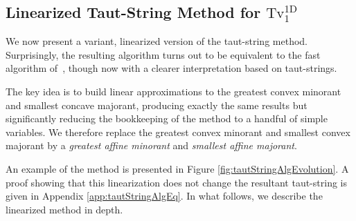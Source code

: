 \documentclass[twoside,11pt]{article}
\newcommand{\tvell}{\text{Tv}}
\newcommand{\oned}{\text{1D}}
\numberwithin{equation}{section}
\numberwithin{theorem}{section}
\begin{document}
\subsection{Linearized Taut-String Method for $\tvell_1^{\oned}$}
\label{sec:taut}
We now present a variant, linearized version of the taut-string method. Surprisingly, the resulting algorithm turns out to be equivalent to the fast algorithm of~\citet{fastTV}, though now with a clearer interpretation based on taut-strings.

The key idea is to build linear approximations to the greatest convex minorant and smallest concave majorant, producing exactly the same results but significantly reducing the bookkeeping of the method to a handful of simple variables. We therefore replace the greatest convex minorant and smallest convex majorant by a \emph{greatest affine minorant} and \emph{smallest affine majorant}.

An example of the method is presented in Figure \ref{fig:tautStringAlgEvolution}. A proof showing that this linearization does not change the resultant taut-string is given in Appendix \ref{app:tautStringAlgEq}. In what follows, we describe the linearized method in depth.
\end{document}
